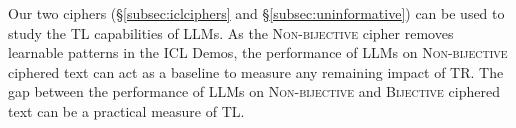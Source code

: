 \documentclass[11pt]{article}
\newcommand{\fzx}[1]{\textbf{\color{blue}[{\bf Zhouxiang}: #1]}}
\newcommand{\daniel}[1]{{\color{purple}[{\bf DK}: #1]}}
\newcommand{\aayush}[1]{{\color{green}[{\bf Aayush}: #1]}}
\begin{document}
Our two ciphers (\S\ref{subsec:iclciphers} and \S\ref{subsec:uninformative}) can be used to study the TL capabilities of LLMs. As the \textsc{Non-bijective} cipher removes learnable patterns in the ICL Demos, the performance of LLMs on \textsc{Non-bijective} ciphered text can act as a baseline to measure any remaining impact of TR. The gap between the performance of LLMs on \textsc{Non-bijective} and \textsc{Bijective} ciphered text can be a practical measure of TL.









\end{document}
